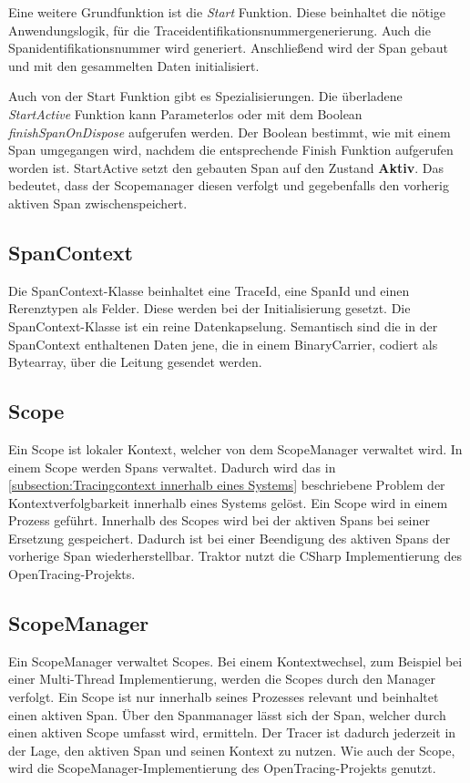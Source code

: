 Eine weitere Grundfunktion ist die \emph{Start} Funktion. Diese beinhaltet die nötige Anwendungslogik, für die Traceidentifikationsnummergenerierung. Auch die Spanidentifikationsnummer wird generiert. Anschließend wird der Span gebaut und mit den gesammelten Daten initialisiert.

Auch von der Start Funktion gibt es Spezialisierungen. Die überladene \emph{StartActive} Funktion kann Parameterlos oder mit dem Boolean \emph{finishSpanOnDispose} aufgerufen werden. Der Boolean bestimmt, wie mit einem Span umgegangen wird, nachdem die entsprechende Finish Funktion aufgerufen worden ist. StartActive setzt den gebauten Span auf den Zustand \textbf{Aktiv}. Das bedeutet, dass der Scopemanager diesen verfolgt und gegebenfalls den vorherig aktiven Span zwischenspeichert.

\subsection{SpanContext}
\label{subsection:SpanContext}

Die SpanContext-Klasse beinhaltet eine TraceId, eine SpanId und einen Rerenztypen als Felder. Diese werden bei der Initialisierung gesetzt. Die SpanContext-Klasse ist ein reine Datenkapselung. Semantisch sind die in der SpanContext enthaltenen Daten jene, die in einem BinaryCarrier, codiert als Bytearray, über die Leitung gesendet werden.

\subsection{Scope}
\label{subsection:Scope}

Ein Scope ist lokaler Kontext, welcher von dem ScopeManager verwaltet wird. In einem Scope werden Spans verwaltet. Dadurch wird das in \cref{subsection:Tracingcontext innerhalb eines Systems} beschriebene Problem der Kontextverfolgbarkeit innerhalb eines Systems gelöst. Ein Scope wird in einem Prozess geführt. Innerhalb des Scopes wird bei der aktiven Spans bei seiner Ersetzung gespeichert. Dadurch ist bei einer Beendigung des aktiven Spans der vorherige Span wiederherstellbar. Traktor nutzt die CSharp Implementierung des OpenTracing-Projekts.

\subsection{ScopeManager}
\label{subsection:SpanManager}
Ein ScopeManager verwaltet Scopes. Bei einem Kontextwechsel, zum Beispiel bei einer Multi-Thread Implementierung, werden die Scopes durch den Manager verfolgt. Ein Scope ist nur innerhalb seines Prozesses relevant und beinhaltet einen aktiven Span. Über den Spanmanager lässt sich der Span, welcher durch einen aktiven Scope umfasst wird, ermitteln. Der Tracer ist dadurch jederzeit in der Lage, den aktiven Span und seinen Kontext zu nutzen. Wie auch der Scope, wird die ScopeManager-Implementierung des OpenTracing-Projekts genutzt. 

